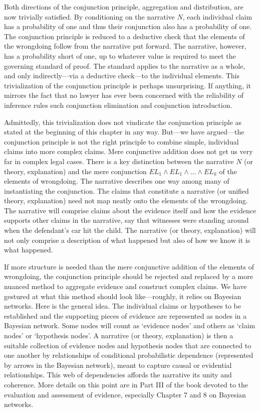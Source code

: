 \documentclass[
  10pt,
  dvipsnames,enabledeprecatedfontcommands]{scrartcl}
\begin{document}
Both directions of the conjunction principle, aggregation and
distribution, are now trivially satisfied. By conditioning on the
narrative \(N\), each individual claim has a probability of one and thus
their conjunction also has a probability of one. The conjunction
principle is reduced to a deductive check that the elements of the
wrongdoing follow from the narrative put forward. The narrative,
however, has a probability short of one, up to whatever value is
required to meet the governing standard of proof. The standard applies
to the narrative as a whole, and only indirectly---via a deductive
check---to the individual elements. This trivialization of the
conjunction principle is perhaps unsurprising. If anything, it mirrors
the fact that no lawyer has ever been concerned with the reliability of
inference rules such conjunction elimination and conjunction
introduction.

Admittedly, this trivialization does not vindicate the conjunction
principle as stated at the beginning of this chapter in any way.
But---we have argued---the conjunction principle is not the right
principle to combine simple, individual claims into more complex claims.
Mere conjunctive addition does not get us very far in complex legal
cases. There is a key distinction between the narrative \(N\) (or
theory, explanation) and the mere conjunction
\(EL_1\wedge EL_1 \wedge \dots \wedge EL_k\) of the elements of
wrongdoing. The narrative describes one way among many of instantiating
the conjunction. The claims that constitute a narrative (or unified
theory, explanation) need not map neatly onto the elements of the
wrongdoing. The narrative will comprise claims about the evidence itself
and how the evidence supports other claims in the narrative, say that
witnesses were standing around when the defendant's car hit the child.
The narrative (or theory, explanation) will not only comprise a
description of what happened but also of how we know it is what
happened.

If more structure is needed than the mere conjunctive addition of the
elements of wrongdoing, the conjunction principle should be rejected and
replaced by a more nuanced method to aggregate evidence and construct
complex claims. We have gestured at what this method should look
like---roughly, it relies on Bayesian networks. Here is the general
idea. The individual claims or hypotheses to be established and the
supporting pieces of evidence are represented as nodes in a Bayesian
network. Some nodes will count as `evidence nodes' and others as `claim
nodes' or `hypothesis nodes'. A narrative (or theory, explanation) is
then a suitable collection of evidence nodes and hypothesis nodes that
are connected to one another by relationships of conditional
probabilistic dependence (represented by arrows in the Bayesian
network), meant to capture causal or evidential relationships. This web
of dependencies affords the narrative its unity and coherence. More
details on this point are in Part III of the book devoted to the
evaluation and assessment of evidence, especially Chapter 7 and 8 on
Bayesian networks.
\end{document}
